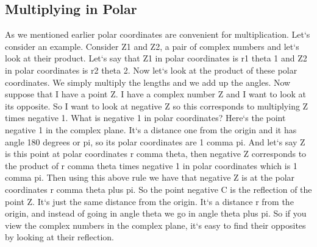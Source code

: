\subsection{Multiplying in Polar}
As we mentioned earlier polar coordinates are convenient for multiplication.
Let`s consider an example.
Consider Z1 and Z2, a pair of complex numbers and let`s look at their product.
Let`s say that Z1 in polar coordinates is r1 theta 1 and Z2 in polar coordinates is r2 theta 2.
Now let`s look at the product of these polar coordinates.
We simply multiply the lengths and we add up the angles.
Now suppose that I have a point Z\@.
I have a complex number Z and I want to look at its opposite.
So I want to look at negative Z so this corresponds to multiplying Z times negative 1.
What is negative 1 in polar coordinates? Here`s the point negative 1 in the complex plane.
It`s a distance one from the origin and it has angle 180 degrees or pi, so its polar coordinates are 1 comma pi.
And let`s say Z is this point at polar coordinates r comma theta, then negative Z corresponds to the product of r comma theta times negative 1 in polar coordinates which is 1 comma pi.
Then using this above rule we have that negative Z is at the polar coordinates r comma theta plus pi.
So the point negative C is the reflection of the point Z\@.
It`s just the same distance from the origin.
It`s a distance r from the origin, and instead of going in angle theta we go in angle theta plus pi.
So if you view the complex numbers in the complex plane, it`s easy to find their opposites by looking at their reflection.

